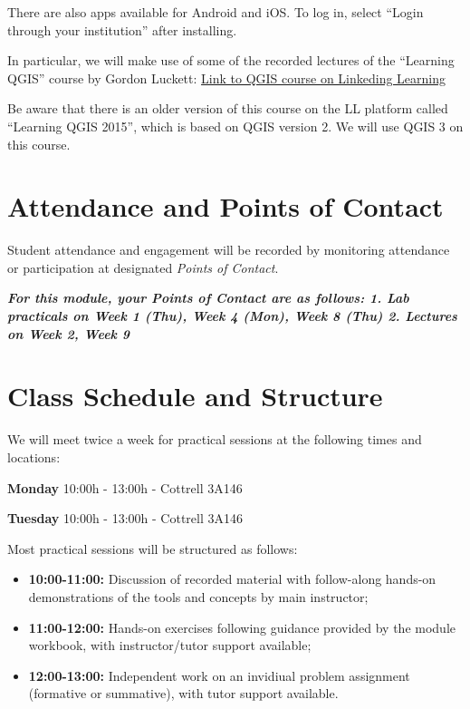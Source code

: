 \documentclass[
]{book}
\providecommand{\tightlist}{%
  \setlength{\itemsep}{0pt}\setlength{\parskip}{0pt}}
\begin{document}
There are also apps available for Android and iOS. To log in, select ``Login through your institution'' after installing.

In particular, we will make use of some of the recorded lectures of the ``Learning QGIS'' course by Gordon Luckett:
\href{https://www.linkedin.com/learning/learning-qgis-2/}{Link to QGIS course on Linkeding Learning}

Be aware that there is an older version of this course on the LL platform called ``Learning QGIS 2015'', which is based on QGIS version 2. We will use QGIS 3 on this course.

\hypertarget{attendance-and-points-of-contact}{%
\section{Attendance and Points of Contact}\label{attendance-and-points-of-contact}}

Student attendance and engagement will be recorded by monitoring attendance or participation at designated \emph{Points of Contact}.

\textbf{\emph{For this module, your Points of Contact are as follows:
1. Lab practicals on Week 1 (Thu), Week 4 (Mon), Week 8 (Thu) 2. Lectures on
Week 2, Week 9 }}

\hypertarget{class-schedule-and-structure}{%
\section{Class Schedule and Structure}\label{class-schedule-and-structure}}

We will meet twice a week for practical sessions at the following times and locations:

\textbf{Monday} 10:00h - 13:00h - Cottrell 3A146

\textbf{Tuesday} 10:00h - 13:00h - Cottrell 3A146

Most practical sessions will be structured as follows:

\begin{itemize}
\tightlist
\item
  \textbf{10:00-11:00:} Discussion of recorded material with follow-along hands-on demonstrations of the tools and concepts by main instructor;
\item
  \textbf{11:00-12:00:} Hands-on exercises following guidance provided by the module workbook, with instructor/tutor support available;
\item
  \textbf{12:00-13:00:} Independent work on an invidiual problem assignment (formative or summative), with tutor support available.
\end{itemize}
\end{document}
